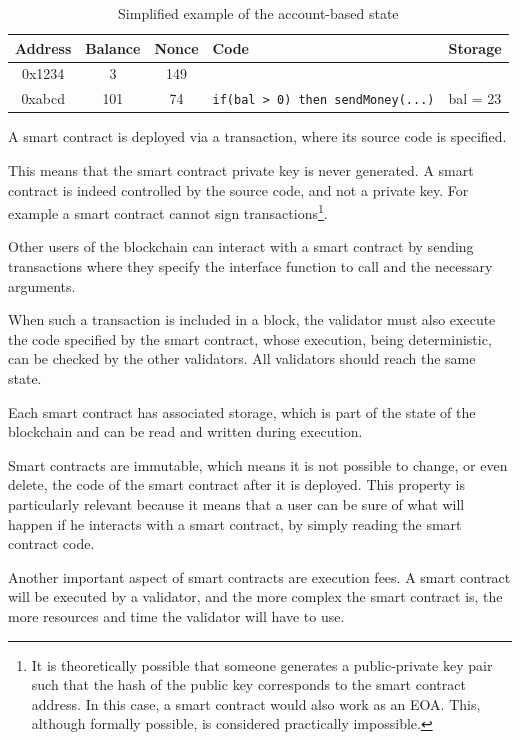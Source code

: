 \documentclass[12pt]{article}
\begin{document}
\begin{table}[h]
    \centering
    \begin{tabular}{|c|c|c|l|l|}
        \hline
        \textbf{Address} & \textbf{Balance} & \textbf{Nonce} & \textbf{Code} & \textbf{Storage} \\
        \hline
        0x1234 & 3 & 149 & & \\        
        0xabcd & 101 & 74 & \verb|if(bal > 0) then sendMoney(...)| & bal = 23 \\
        \hline       
    \end{tabular}
    \caption{Simplified example of the account-based state}
    \label{table:account_based_state}
\end{table}

A smart contract is deployed via a transaction, where its source code is specified.

This means that the smart contract private key is never generated. A smart contract is indeed controlled by the source code, and not a private key. For example a smart contract cannot sign transactions\footnote{It is theoretically possible that someone generates a public-private key pair such that the hash of the public key corresponds to the smart contract address. In this case, a smart contract would also work as an EOA. This, although formally possible, is considered practically impossible.}.

Other users of the blockchain can interact with a smart contract by sending transactions where they specify the interface function to call and the necessary arguments.

When such a transaction is included in a block, the validator must also execute the code specified by the smart contract, whose execution, being deterministic, can be checked by the other validators. All validators should reach the same state.

Each smart contract has associated storage, which is part of the state of the blockchain and can be read and written during execution.

Smart contracts are immutable, which means it is not possible to change, or even delete, the code of the smart contract after it is deployed. 
This property is particularly relevant because it means that a user can be sure of what will happen if he interacts with a smart contract, by simply reading the smart contract code.

Another important aspect of smart contracts are execution fees. A smart contract will be executed by a validator, and the more complex the smart contract is, the more resources and time the validator will have to use.
\end{document}
